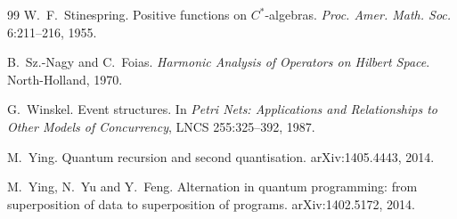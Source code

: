 \documentclass[11pt,a4paper]{article}
\theoremstyle{plain}
\theoremstyle{definition}
\theoremstyle{remark}
\begin{document}
\begin{thebibliography}{99}
 W.~F.~Stinespring.
Positive functions on $C^{*}$-algebras.
\emph{Proc. Amer. Math. Soc.} 6:211--216, 1955.

 B.~Sz.-Nagy and C.~Foias.
\emph{Harmonic Analysis of Operators on Hilbert Space}.
North-Holland, 1970.

 G.~Winskel.
Event structures. In \emph{Petri Nets: Applications and Relationships to Other
Models of Concurrency}, LNCS 255:325--392, 1987.

 M.~Ying.
Quantum recursion and second quantisation. arXiv:1405.4443, 2014.

 M.~Ying, N.~Yu and Y.~Feng.
Alternation in quantum programming: from superposition of data to superposition
of programs. arXiv:1402.5172, 2014.

\end{thebibliography}
\end{document}
